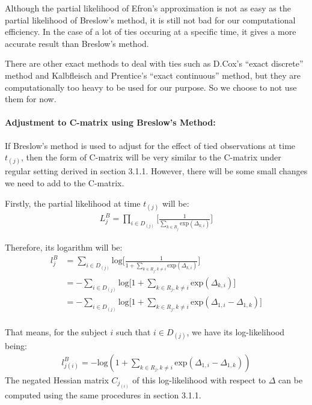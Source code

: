 \documentclass[]{article}
\let\oldparagraph\paragraph
\renewcommand{\paragraph}[1]{\oldparagraph{#1}\mbox{}}
\begin{document}
Although the partial likelihood of Efron's approximation is not as easy
as the partial likelihood of Breslow's method, it is still not bad for
our computational efficiency. In the case of a lot of ties occuring at a
specific time, it gives a more accurate result than Breslow's method.

There are other exact methods to deal with ties such as D.Cox's ``exact
discrete'' method and Kalbfleisch and Prentice's ``exact continuous''
method, but they are computationally too heavy to be used for our
purpose. So we choose to not use them for now.

\hypertarget{adjustment-to-c-matrix-using-breslows-method}{%
\paragraph{Adjustment to C-matrix using Breslow's
Method:}\label{adjustment-to-c-matrix-using-breslows-method}}

If Breslow's method is used to adjust for the effect of tied
observations at time \(t_{(j)}\), then the form of C-matrix will be very
similar to the C-matrix under regular setting derived in section 3.1.1.
However, there will be some small changes we need to add to the
C-matrix.

Firstly, the partial likelihood at time \(t_{(j)}\) will be:
\begin{equation}\begin{aligned}\label{eqn:moreonBresl}
L_j^B = \prod_{i\in D_{(j)}}^{}\bigg[ \frac{1}{\sum_{k\in R_j}^{}\text{exp}(\Delta_{k,i})} \bigg]
\end{aligned}\end{equation}

Therefore, its logarithm will be:
\begin{equation}\begin{aligned}\label{eqn:moreonBresl2}
l_j^B &= \sum_{i\in D_{(j)}}^{}\text{log}\bigg[ \frac{1}{1+\sum_{k\in R_j,k\neq i}^{}\text{exp}(\Delta_{k,i})} \bigg]\\
&= -\sum_{i\in D_{(j)}}\text{log}\bigg[ {1+\sum_{k\in R_j,k\neq i}^{}\text{exp}(\Delta_{k,i})} \bigg]\\
&= -\sum_{i\in D_{(j)}}\text{log}\bigg[ {1+\sum_{k\in R_j,k\neq i}^{}\text{exp}(\Delta_{1,i}-\Delta_{1,k})} \bigg]\\
\end{aligned}\end{equation}

That means, for the subject \(i\) such that \(i\in D_{(j)}\), we have
its log-likelihood being:
\begin{equation}\begin{aligned}\label{eqn:moreonBresl2fori}
l_{j(i)}^B = -\text{log}(1+\sum_{k\in R_{j},k\neq i}\text{exp}(\Delta_{1,i}-\Delta_{1,k}))
\end{aligned}\end{equation} The negated Hessian matrix \(C_{j_{(i)}}\)
of this log-likelihood with respect to \(\Delta\) can be computed using
the same procedures in section 3.1.1.
\end{document}
